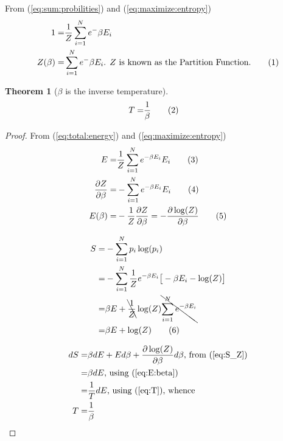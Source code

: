\documentclass[]{article}
\newcommand\numberthis{\addtocounter{equation}{1}\tag{\theequation}}
\newtheorem{thm}{Theorem}
\begin{document}
From (\ref{eq:sum:probilities}) and (\ref{eq:maximize:entropy})
\begin{align*}
1 =& \frac{1}{Z}  \sum_{i=1}^{N} e^-{\beta E_i}\\
Z(\beta) =& \sum_{i=1}^{N} e^-{\beta E_i} \text{. $Z$ is known as the Partition Function.} \numberthis \label{eq:partition:function}
\end{align*}

\begin{thm}[$\beta$ is the inverse temperature]\label{thm:inverseT}
	\begin{align*}
		T =& \frac{1}{\beta}\numberthis\label{eq:inverseT}
	\end{align*}
\end{thm}

\begin{proof}
	From (\ref{eq:total:energy}) and (\ref{eq:maximize:entropy})
	\begin{align*}
	E =& \frac{1}{Z}  \sum_{i=1}^{N} e^{-\beta E_i} E_i \numberthis \label{eq:E}\\
	\frac{\partial Z}{\partial \beta} =& - \sum_{i=1}^{N} e^{-\beta E_i} E_i \numberthis \label{eq:dZ}\\
	E(\beta) =& - \frac{1}{Z} \frac{\partial Z}{\partial \beta} = - \frac{\partial \log(Z)}{\partial \beta} \numberthis \label{eq:E:beta}
	\end{align*}
	
	\begin{align*}
	S =& -\sum_{i=1}^{N} p_i \log(p_i)\\
	=& - \sum_{i=1}^{N} \frac{1}{Z} e^{- \beta E_i}\big[- \beta E_i -\log(Z)\big]\\
	=& \beta E +  \bcancel{\frac{1}{Z}} \log(Z)  \bcancel{\sum_{i=1}^{N} e^{-\beta E_i}}\\
	=& \beta E +   \log(Z)  \numberthis \label{eq:S_Z}
	\end{align*}
	
	\begin{align*}
	dS =& \beta dE + E d\beta + \frac{\partial \log(Z)}{\partial \beta} d\beta \text{, from (\ref{eq:S_Z})}\\
	=& \beta dE \text{, using (\ref{eq:E:beta})}\\
	=& \frac{1}{T} dE \text{, using (\ref{eq:T})}\text{, whence}\\
	T =& \frac{1}{\beta}
	\end{align*}
\end{proof}
\end{document}
